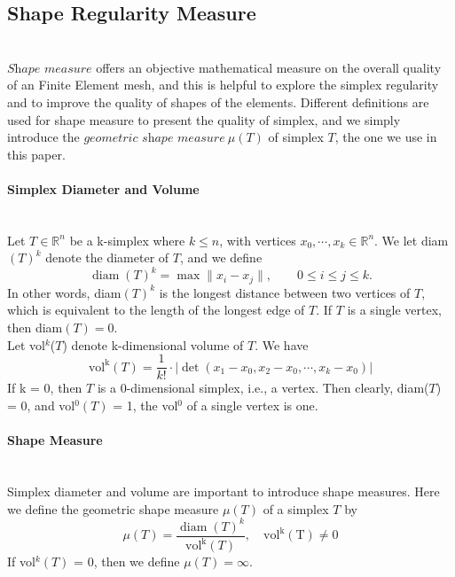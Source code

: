 \subsection{Shape Regularity Measure}\mbox{}\\
    $\textit{Shape measure}$ offers an objective mathematical measure on the overall quality of an Finite Element mesh, and this is helpful to explore the simplex regularity and to improve the quality of shapes of the elements. Different definitions are used for shape measure to present the quality of simplex, and we simply introduce the $\textit{geometric shape measure} ~\mu({T})$ of simplex ${T}$,  the one we use in this paper.

    \paragraph{Simplex Diameter and Volume}\mbox{}\\
    Let ${T} \in\mathbb{R}^n$ be a k-simplex where $k \leqslant n$, with vertices ${x}_0, \cdots, {x}_k \in\mathbb{R}^n$. We let diam$({T})^k$ denote the diameter of ${T}$, and we define
    \begin{equation*}
    \operatorname{diam}({T})^k = \max \| x_i - x_j \|, \qquad 0\leqslant i\leqslant j\leqslant k.
    \end{equation*}
    In other words, diam$({T})^k$ is the longest distance between two vertices of ${T}$, which is equivalent to the length of the longest edge of ${T}$. If ${T}$ is a single vertex, then diam$({T}) = 0$.\\

    \noindent
    Let vol$^k$(${T}$) denote k-dimensional volume of ${T}$. We have
    \begin{equation*}
    \operatorname{vol^k} ({T}) = \frac{1}{k!}\cdot|\det(x_1-x_0, x_2-x_0,\cdots, x_k-x_0)|
    \end{equation*}
    \noindent
    If k = 0, then ${T}$ is a 0-dimensional simplex, i.e., a vertex. Then clearly, diam(${T}$) = 0, and vol$^0 ({T})$ = 1, the vol$^0$ of a single vertex is one.

    
    \paragraph{Shape Measure}\mbox{}\\
    Simplex diameter and volume are important to introduce shape measures. Here we define the {geometric shape measure} $\mu({{T}})$ of a simplex ${T}$ by
    \begin{equation*}
    \mu({{T}}) = \frac{\operatorname{diam}({T})^k}{\operatorname{vol^k}({T})}, \quad\operatorname{vol^k(T) \neq 0}
    \end{equation*}
    If vol$^k(T)$ = 0, then we define $\mu({{T}}) = \infty$.\\
    
